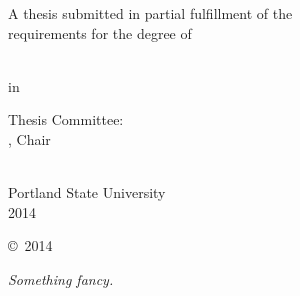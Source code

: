 \begin{SingleSpace}
\begin{center}
  A thesis submitted in partial fulfillment of the\\
  requirements for the degree of
\end{center}

\vfill

\begin{center}
  \thesisDegree\\
  in\\
  \thesisDept
\end{center}

\vfill

\begin{center}
  Thesis Committee:\\
  \thesisAdvisor, Chair\\
  \thesisCommitteeOne\\
  \thesisCommitteeTwo
\end{center}

\vfill

\begin{center}
    Portland State University\\
    2014
\end{center}
\end{SingleSpace}

\cleardoublepage  %
\thispagestyle{empty}

\begin{center}
    \vspace*{2.5 in}
    \copyright~2014 \thesisAuthor
\end{center}

\cleardoublepage



\clearpage

\vspace*{\fill}
{\hfill\sffamily\itshape Something fancy.}  %


\rmfamily
\normalfont



\clearpage
 


\tableofcontents*  %



\clearpage
\listoftables

\clearpage
\listoffigures



